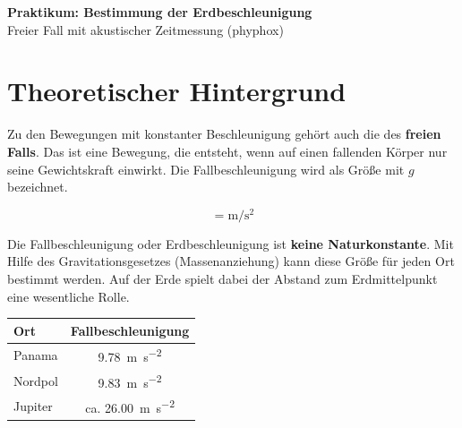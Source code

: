\documentclass[11pt,a4paper]{scrartcl}
\begin{document}
	
	\begin{center}
		{\LARGE\bfseries Praktikum: Bestimmung der Erdbeschleunigung}\\[0.5cm]
		{\large Freier Fall mit akustischer Zeitmessung (phyphox)}
	\end{center}
	
	\vspace{0.5cm}
	
	\section*{Theoretischer Hintergrund}
	
	Zu den Bewegungen mit konstanter Beschleunigung gehört auch die des \textbf{freien Falls}. Das ist eine Bewegung, die entsteht, wenn auf einen fallenden Körper nur seine Gewichtskraft einwirkt. Die Fallbeschleunigung wird als Größe mit $g$ bezeichnet.
	
	\begin{formelbox}[title={\faIcon{square-root-alt} Einheit der Fallbeschleunigung}]
		\begin{equation*}
			[g] = \si{\metre\per\second\squared}
		\end{equation*}
	\end{formelbox}
	
	\begin{infobox}[title={\faIcon{info-circle} Ortsabhängigkeit der Erdbeschleunigung}]
		Die Fallbeschleunigung oder Erdbeschleunigung ist \textbf{keine Naturkonstante}. Mit Hilfe des Gravitationsgesetzes (Massenanziehung) kann diese Größe für jeden Ort bestimmt werden. Auf der Erde spielt dabei der Abstand zum Erdmittelpunkt eine wesentliche Rolle.
		
		\vspace{0.3cm}
		\begin{center}
			\begin{tabular}{lc}
				\toprule
				\textbf{Ort} & \textbf{Fallbeschleunigung} \\
				\midrule
				Panama & \SI{9,78}{\metre\per\second\squared} \\
				Nordpol & \SI{9,83}{\metre\per\second\squared} \\
				Jupiter & ca. \SI{26,00}{\metre\per\second\squared} \\
				\bottomrule
			\end{tabular}
		\end{center}
	\end{infobox}
	
\end{document}
